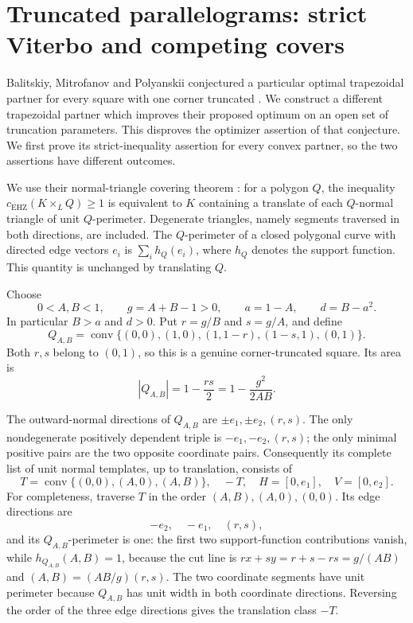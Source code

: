 \section{Truncated parallelograms: strict Viterbo and competing covers}
\label{sec:truncated-square-cover}

Balitskiy, Mitrofanov and Polyanskii conjectured a particular optimal
trapezoidal partner for every square with one corner truncated
\cite[Section~6.2, Conjecture~6.1]{BMP2026}. We construct a different
trapezoidal partner which improves their proposed optimum on an open set
of truncation parameters. This disproves the optimizer assertion of that
conjecture. We first prove its strict-inequality assertion for every convex
partner, so the two assertions have different outcomes.

We use their normal-triangle covering theorem
\cite[Theorem~3.3]{BMP2026}: for a polygon $Q$, the inequality
$c_{\mathrm{EHZ}}(K\times_L Q)\geq1$ is equivalent to $K$ containing a
translate of each $Q$-normal triangle of unit $Q$-perimeter. Degenerate
triangles, namely segments traversed in both directions, are included.
The $Q$-perimeter of a closed polygonal curve with directed edge vectors
$e_i$ is $\sum_i h_Q(e_i)$, where $h_Q$ denotes the support function.
This quantity is unchanged by translating $Q$.

Choose
\[
 0<A,B<1,\qquad g=A+B-1>0,\qquad a=1-A,\qquad d=B-a^2.
\]
In particular $B>a$ and $d>0$. Put $r=g/B$ and $s=g/A$, and define
\[
 Q_{A,B}=\operatorname{conv}\{(0,0),(1,0),(1,1-r),(1-s,1),(0,1)\}.
\]
Both $r,s$ belong to $(0,1)$, so this is a genuine corner-truncated
square. Its area is
\begin{equation}\label{eq:truncated-Q-area}
 |Q_{A,B}|=1-\frac{rs}{2}=1-\frac{g^2}{2AB}.
\end{equation}

The outward-normal directions of $Q_{A,B}$ are
$\pm e_1,\pm e_2,(r,s)$. The only nondegenerate positively dependent
triple is $-e_1,-e_2,(r,s)$; the only minimal positive pairs are the two
opposite coordinate pairs. Consequently its complete list of unit normal
templates, up to translation, consists of
\begin{equation}\label{eq:four-truncated-templates}
 T=\operatorname{conv}\{(0,0),(A,0),(A,B)\},\quad -T,\quad
 H=[0,e_1],\quad V=[0,e_2].
\end{equation}
For completeness, traverse $T$ in the order $(A,B),(A,0),(0,0)$.
Its edge directions are
\[ -e_2,\quad -e_1,\quad(r,s), \]
 and its $Q_{A,B}$-perimeter
is one: the first two support-function contributions vanish, while
$h_{Q_{A,B}}(A,B)=1$, because the cut line is
$rx+sy=r+s-rs=g/(AB)$ and $(A,B)=(AB/g)(r,s)$.
The two coordinate segments have unit perimeter because $Q_{A,B}$ has
unit width in both coordinate directions. Reversing the order of the three
edge directions gives the translation class $-T$.

